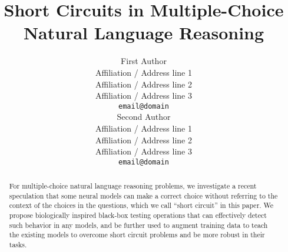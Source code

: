 \documentclass[11pt]{article}
\title{Short Circuits in Multiple-Choice Natural Language Reasoning}
\author{First Author \\
  Affiliation / Address line 1 \\
  Affiliation / Address line 2 \\
  Affiliation / Address line 3 \\
  \texttt{email@domain} \\\And
  Second Author \\
  Affiliation / Address line 1 \\
  Affiliation / Address line 2 \\
  Affiliation / Address line 3 \\
  \texttt{email@domain} \\}
\date{}
\begin{document}
\maketitle
\begin{abstract}
For multiple-choice natural language reasoning problems, 
we investigate a recent speculation that some neural models 
can make a correct choice without referring to the context of 
the choices in the questions, which we call ``short circuit'' 
in this paper. 
We propose biologically inspired black-box testing
operations that can effectively detect such behavior in any models, 
and be further used to augment training data to teach the existing
models to overcome short circuit problems and be more robust 
in their tasks.
\end{abstract}








\end{document}
